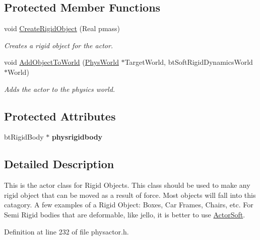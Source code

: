 \subsection*{Protected Member Functions}
\begin{DoxyCompactItemize}
\item 
void \hyperlink{classActorRigid_a57d5fe315a120e97bf34e1930a7678d8}{CreateRigidObject} (Real pmass)
\begin{DoxyCompactList}\small\item\em Creates a rigid object for the actor. \item\end{DoxyCompactList}\item 
void \hyperlink{classActorRigid_ac6d7e05944623329f0c2140c19e2c49e}{AddObjectToWorld} (\hyperlink{classPhysWorld}{PhysWorld} $\ast$TargetWorld, btSoftRigidDynamicsWorld $\ast$World)
\begin{DoxyCompactList}\small\item\em Adds the actor to the physics world. \item\end{DoxyCompactList}\end{DoxyCompactItemize}
\subsection*{Protected Attributes}
\begin{DoxyCompactItemize}
\item 
\hypertarget{classActorRigid_a6942757e081b5261dbf266f197dc56ab}{
btRigidBody $\ast$ {\bfseries physrigidbody}}
\label{d5/d10/classActorRigid_a6942757e081b5261dbf266f197dc56ab}

\end{DoxyCompactItemize}


\subsection{Detailed Description}
This is the actor class for Rigid Objects. This class should be used to make any rigid object that can be moved as a result of force. Most objects will fall into this catagory. A few examples of a Rigid Object: Boxes, Car Frames, Chairs, etc. For Semi Rigid bodies that are deformable, like jello, it is better to use \hyperlink{classActorSoft}{ActorSoft}. 

Definition at line 232 of file physactor.h.



